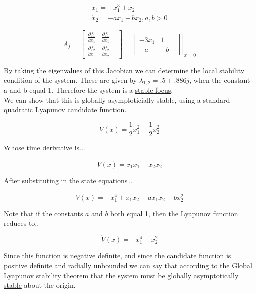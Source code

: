 $$
\begin{array}{l}
\dot{x}_{1}=-x_{1}^{3}+x_{2} \\
\dot{x}_{2}=-a x_{1}-b x_{2}, a, b>0
\end{array}
$$



$$
A_j =
\begin{bmatrix}
  \frac{\partial f_{1}}{\partial x_{1}} & \frac{\partial f_{1}}{\partial x_{1}} & \\

  \frac{\partial f_{2}}{\partial x_{1}} & \frac{\partial f_{2}}{\partial x_{2}}&
\end{bmatrix}
=
\left .
\begin{bmatrix}

-3x_1 & 1 & \\

-a  & -b &

\end{bmatrix} \right\rvert_{x=0}
$$



\noindent By taking the eigenvalues of this Jacobian we can determine the local stability condition of the system. These are given by $\lambda_{1,2} = .5\pm .886j $, when the constant a and b equal 1. Therefore the system is a \underline{stable focus}. \\


\noindent We can show that this is globally asymptoticially stable, using a standard quadratic Lyapunov candidate function.

$$
V(x) = \frac{1}{2}x_1^2 + \frac{1}{2}x_2^2
$$

\noindent Whose time derivative is...

$$
\dot{V}(x) = x_1\dot{x_1} + x_2\dot{x_2}
$$

\noindent After substituting in the state equations...

$$
\dot{V}(x) = -x_1^4 + x_1x_2 - ax_1x_2 - bx_2^2
$$


\noindent Note that if the constants $a$ and $b$ both equal 1, then the Lyapunov function reduces to..

$$
\dot{V}(x) = -x_1^4 -x_2^2
$$

\noindent Since this function is negative definite, and since the candidate function is positive definite and radially unbounded we can say that according to the Global Lyapunov stability theorem that the system must be \underline{globally asymptotically stable} about the origin. 
